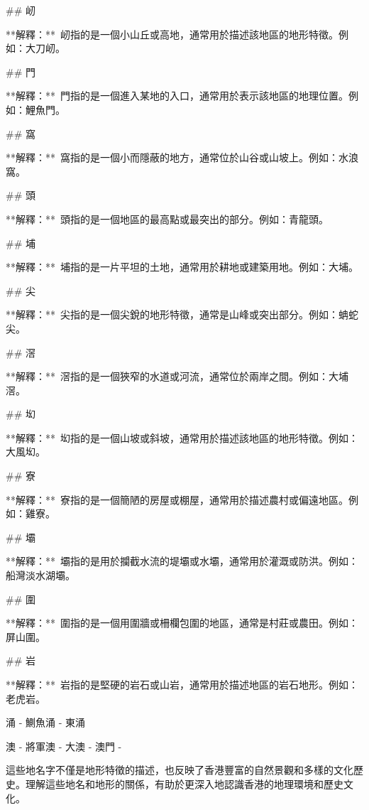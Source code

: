 ## 屻

**解釋：** 屻指的是一個小山丘或高地，通常用於描述該地區的地形特徵。例如：大刀屻。  

## 門

**解釋：** 門指的是一個進入某地的入口，通常用於表示該地區的地理位置。例如：鯉魚門。  

## 窩

**解釋：** 窩指的是一個小而隱蔽的地方，通常位於山谷或山坡上。例如：水浪窩。

  

## 頭

**解釋：** 頭指的是一個地區的最高點或最突出的部分。例如：青龍頭。

  

## 埔

**解釋：** 埔指的是一片平坦的土地，通常用於耕地或建築用地。例如：大埔。

  

## 尖

**解釋：** 尖指的是一個尖銳的地形特徵，通常是山峰或突出部分。例如：蚺蛇尖。

  

## 滘

**解釋：** 滘指的是一個狹窄的水道或河流，通常位於兩岸之間。例如：大埔滘。

  

## 㘭

**解釋：** 㘭指的是一個山坡或斜坡，通常用於描述該地區的地形特徵。例如：大風㘭。

  

## 寮

**解釋：** 寮指的是一個簡陋的房屋或棚屋，通常用於描述農村或偏遠地區。例如：雞寮。

  

## 壩

**解釋：** 壩指的是用於攔截水流的堤壩或水壩，通常用於灌溉或防洪。例如：船灣淡水湖壩。

  

## 圍

**解釋：** 圍指的是一個用圍牆或柵欄包圍的地區，通常是村莊或農田。例如：屏山圍。

  

## 岩

**解釋：** 岩指的是堅硬的岩石或山岩，通常用於描述地區的岩石地形。例如：老虎岩。


涌
- 鰂魚涌
- 東涌

澳
- 將軍澳 
- 大澳
- 澳門
- 

這些地名字不僅是地形特徵的描述，也反映了香港豐富的自然景觀和多樣的文化歷史。理解這些地名和地形的關係，有助於更深入地認識香港的地理環境和歷史文化。